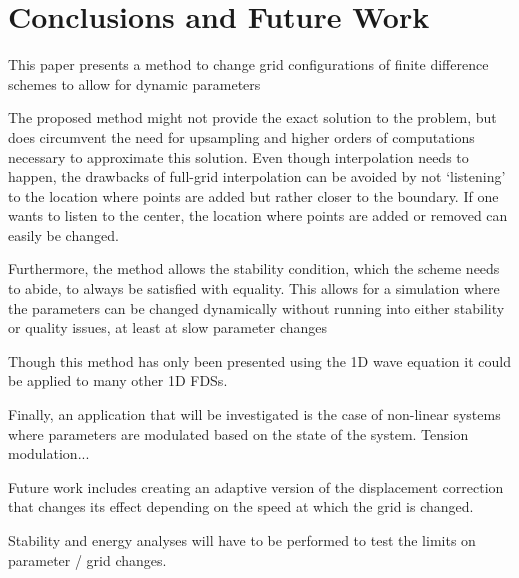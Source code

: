\section{Conclusions and Future Work}\label{sec:conclusion}
This paper presents a method to change grid configurations of finite difference schemes to allow for dynamic parameters


The proposed method might not provide the exact solution to the problem, but does circumvent the need for upsampling and higher orders of computations necessary to approximate this solution. Even though interpolation needs to happen, the drawbacks of full-grid interpolation can be avoided by not `listening' to the location where points are added but rather closer to the boundary. If one wants to listen to the center, the location where points are added or removed can easily be changed.

Furthermore, the method allows the stability condition, which the scheme needs to abide, to always be satisfied with equality. This allows for a simulation where the parameters can be changed dynamically without running into either stability or quality issues, at least at slow parameter changes

Though this method has only been presented using the 1D wave equation it could be applied to many other 1D FDSs. 


Finally, an application that will be investigated is the case of non-linear systems where parameters are modulated based on the state of the system. Tension modulation...


Future work includes creating an adaptive version of the displacement correction that changes its effect depending on the speed at which the grid is changed.

Stability and energy analyses will have to be performed to test the limits on parameter / grid changes.
